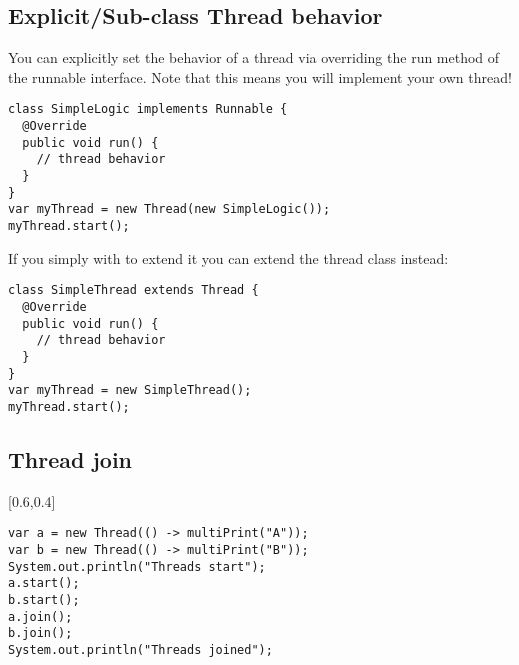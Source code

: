 \documentclass[main.tex,fontsize=8pt,paper=a4,paper=portrait,DIV=calc,]{scrartcl}
\begin{document}
\subsection{Explicit/Sub-class Thread behavior}
You can explicitly set the behavior of a thread via overriding the run method of the runnable interface.\newline
Note that this means you will implement your own thread!\newline
\begin{lstlisting}
class SimpleLogic implements Runnable {
  @Override
  public void run() {
    // thread behavior
  }
}
var myThread = new Thread(new SimpleLogic());
myThread.start();
\end{lstlisting}
\vspace{2mm}
If you simply with to extend it you can extend the thread class instead:\newline
\begin{lstlisting}
class SimpleThread extends Thread {
  @Override
  public void run() {
    // thread behavior
  }
}
var myThread = new SimpleThread();
myThread.start();
\end{lstlisting}
\vspace{2mm}

\subsection{Thread join}
[0.6,0.4]
\begin{lstlisting}
var a = new Thread(() -> multiPrint("A"));
var b = new Thread(() -> multiPrint("B"));
System.out.println("Threads start");
a.start();
b.start();
a.join();
b.join();
System.out.println("Threads joined");
\end{lstlisting}
\vspace{2mm}
\end{document}
